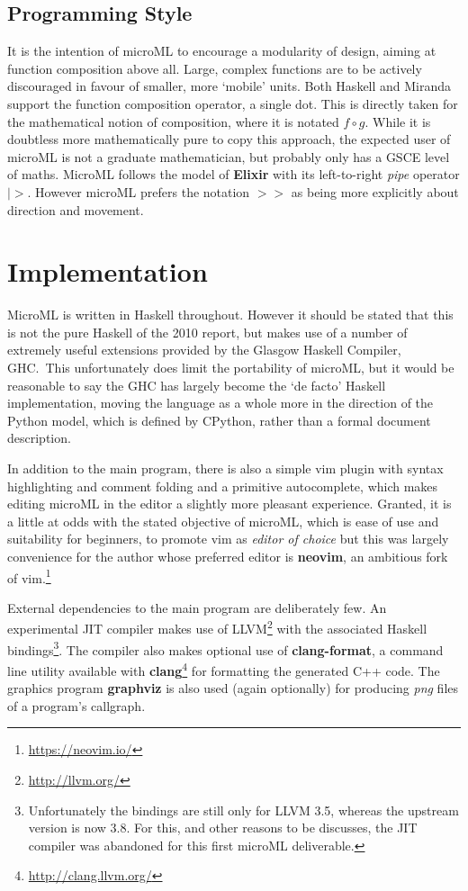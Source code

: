 \documentclass[12pt, a4paper]{report}
\begin{document}
\subsection{Programming Style}
It is the intention of microML to encourage a modularity of design, aiming at function composition
above all. Large, complex functions are to be actively discouraged in favour of smaller, more
`mobile' units. Both Haskell and Miranda support the function composition operator, a single dot.
This is directly taken for the mathematical notion of composition, where it is notated $ f \circ g
$. While it is doubtless more mathematically pure to copy this approach, the expected user of
microML is not a graduate mathematician, but probably only has a GSCE level of maths. MicroML
follows the model of \textbf{Elixir} with its left-to-right \textit{pipe} operator $ |> $. However
microML prefers the notation $ >> $ as being more explicitly about direction and movement.

\section{Implementation}
MicroML is written in Haskell throughout. However it should be stated that this is not the pure
Haskell of the 2010 report, but makes use of a number of extremely useful extensions provided by
the Glasgow Haskell Compiler, GHC.\ This unfortunately does limit the portability of microML, 
but it would be reasonable to say the GHC has largely become the `de facto' Haskell implementation, moving the
language as a whole more in the direction of the Python model, which is defined by CPython, 
rather than a formal document description.

In addition to the main program, there is also a simple vim plugin with syntax highlighting and
comment folding and a primitive autocomplete, which makes editing microML in the editor a slightly
more pleasant experience. Granted, it is a little at odds with the stated objective of microML,
which is ease of use and suitability for beginners, to promote vim as \textit{editor of choice} but
this was largely convenience for the author whose preferred editor is \textbf{neovim}, an ambitious
fork of vim.\footnote{\url{https://neovim.io/}}

External dependencies to the main program are deliberately few. An experimental JIT compiler makes
use of LLVM\footnote{\url{http://llvm.org/}} with the associated Haskell
bindings\footnote{Unfortunately the bindings are still only for LLVM 3.5, whereas the upstream
version is now 3.8. For this, and other reasons to be discusses, the JIT compiler was abandoned for
this first microML deliverable.}. The compiler also makes optional use of \textbf{clang-format}, a
command line utility available with \textbf{clang}\footnote{\url{http://clang.llvm.org/}} for formatting 
the generated C++ code. The graphics program \textbf{graphviz} is also used (again optionally) for 
producing \textit{png} files of a program's callgraph. 
\end{document}
